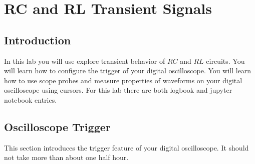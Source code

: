 \chapter{RC and RL Transient Signals}

\section{Introduction}

In this lab you will use explore transient behavior of $RC$ and $RL$
circuits.  You will learn how to configure the trigger of your digital
oscilloscope.  You will learn how to use scope probes and measure
properties of waveforms on your digital oscilloscope using cursors.
For this lab there are both logbook and jupyter notebook entries.

\section{Oscilloscope Trigger}

This section introduces the trigger feature of your digital
oscilloscope.  It should not take more than about one half hour.

